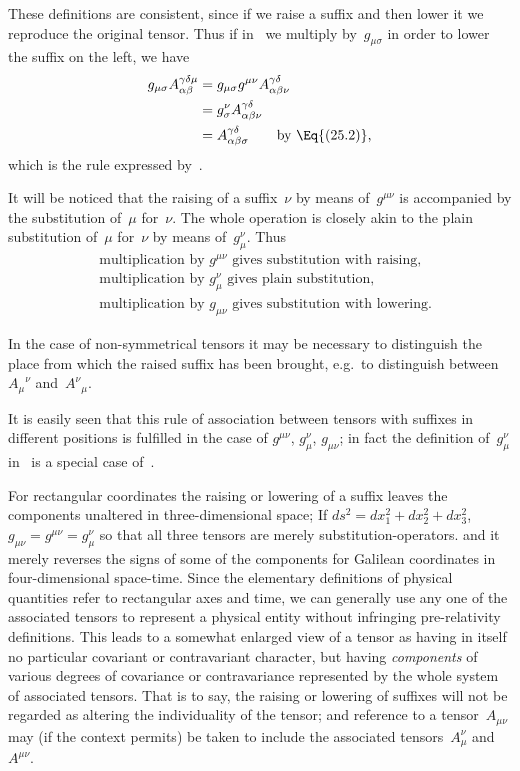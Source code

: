 \documentclass[12pt]{book}
\begin{document}
These definitions are consistent, since if we raise a suffix and then lower
it we reproduce the original tensor. Thus if in~ we multiply by~$g_{\mu\sigma}$ in
order to lower the suffix on the left, we have
\begin{align*}
  g_{\mu\sigma} A_{\alpha\beta}^{\gamma\delta\mu}
  &= g_{\mu\sigma} g^{\mu\nu} A_{\alpha\beta\nu}^{\gamma\delta} \\
  &= g_{\sigma}^{\nu} A_{\alpha\beta\nu}^{\gamma\delta} \\
  &= A_{\alpha\beta\sigma}^{\gamma\delta}\qquad\text{by \Eq{(25.2)},}
\end{align*}
which is the rule expressed by~.

It will be noticed that the raising of a suffix~$\nu$ by means of~$g^{\mu\nu}$ is accompanied
by the substitution of~$\mu$ for~$\nu$. The whole operation is closely akin to
the plain substitution of~$\mu$ for~$\nu$ by means of~$g_{\mu}^{\nu}$. Thus
\begin{align*}
  &\text{multiplication by $g^{\mu\nu}$ gives substitution with raising,} \\
  &\text{multiplication by $g_{\mu}^{\nu}$ gives plain substitution,} \\
  &\text{multiplication by $g_{\mu\nu}$ gives substitution with lowering.}
\end{align*}

In the case of non\hyp{}symmetrical tensors it may be necessary to distinguish
the place from which the raised suffix has been brought, e.g.\ to distinguish
between ${A_{\mu}}^{\nu}$ and~${A^{\nu}}_{\mu}$.

It is easily seen that this rule of association between tensors with suffixes
in different positions is fulfilled in the case of $g^{\mu\nu}$, $g_{\mu}^{\nu}$, $g_{\mu\nu}$; in fact the definition
of~$g_{\mu}^{\nu}$ in~ is a special case of~.

For rectangular coordinates the raising or lowering of a suffix leaves the
components unaltered in three\hyp{}dimensional space\footnotemark;\footnotetext
  {If $ds^{2} = dx_{1}^{2} + dx_{2}^{2} + dx_{3}^{2}$, $g_{\mu\nu} = g^{\mu\nu} = g_{\mu}^{\nu}$ so that all three tensors are merely substitution\hyp{}operators.}
and it merely reverses
%
the signs of some of the components for Galilean coordinates in four\hyp{}dimensional
space-time. Since the elementary definitions of physical
quantities refer to rectangular axes and time, we can generally use any one
of the associated tensors to represent a physical entity without infringing
pre\hyp{}relativity definitions. This leads to a somewhat enlarged view of a tensor
as having in itself no particular covariant or contravariant character, but
having \emph{components} of various degrees of covariance or contravariance represented
by the whole system of associated tensors. That is to say, the raising
or lowering of suffixes will not be regarded as altering the individuality of
the tensor; and reference to a tensor~$A_{\mu\nu}$ may (if the context permits) be
taken to include the associated tensors~$A_{\mu}^{\nu}$ and~$A^{\mu\nu}$.
\end{document}
